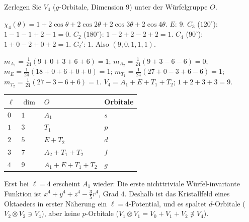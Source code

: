 \begin{aufgabe}
Zerlegen Sie $V_4$ ($g$-Orbitale, Dimension $9$) unter der Würfelgruppe $O$.

\loesung
{}
$\chi_4(\theta) = 1 + 2\cos\theta + 2\cos2\theta + 2\cos3\theta + 2\cos4\theta$. $E$: $9$. $C_3$ ($120^{\circ}$): $1 - 1 - 1 + 2 - 1 = 0$. $C_2$ ($180^{\circ}$): $1 - 2 + 2 - 2 + 2 = 1$. $C_4$ ($90^{\circ}$): $1 + 0 - 2 + 0 + 2 = 1$. $C_2'$: $1$. Also $(9, 0, 1, 1, 1)$.

$m_{A_1} = \frac1{24}(9 + 0 + 3 + 6 + 6) = 1$; $m_{A_2} = \frac1{24}(9 + 3 - 6 - 6) = 0$; $m_E = \frac1{24}(18 + 0 + 6 + 0 + 0) = 1$; $m_{T_1} = \frac1{24}(27 + 0 - 3 + 6 - 6) = 1$; $m_{T_2} = \frac1{24}(27 - 3 - 6 + 6) = 1$. $V_4 = A_1 + E + T_1 + T_2$; $1 + 2 + 3 + 3 = 9$. \checkmark

\begin{center}
{\small
\renewcommand{\arraystretch}{1.46}
\begin{tabular}{@{}P{0.8cm}P{0.8cm}P{4.4cm}P{2.2cm}@{}}
\toprule
$\ell$ & $\dim$ & $O$ & Orbitale\\
\midrule
$0$ & $1$ & $A_1$ & $s$\\
$1$ & $3$ & $T_1$ & $p$\\
$2$ & $5$ & $E + T_2$ & $d$\\
$3$ & $7$ & $A_2 + T_1 + T_2$ & $f$\\
$4$ & $9$ & $A_1 + E + T_1 + T_2$ & $g$\\
\bottomrule
\end{tabular}}
\end{center}
Erst bei $\ell = 4$ erscheint $A_1$ wieder: Die erste nichttriviale Würfel-invariante Funktion ist $x^{4} + y^{4} + z^{4} - \frac35r^{4}$, Grad $4$. Deshalb ist das Kristallfeld eines Oktaeders in erster Näherung ein $\ell = 4$-Potential, und es spaltet $d$-Orbitale ($V_2\otimes V_2\ni V_4$), aber keine $p$-Orbitale ($V_1\otimes V_1 = V_0 + V_1 + V_2\not\ni V_4$).

\begin{center}
\begin{minipage}{0.88\textwidth}
\end{minipage}
\end{center}
\end{aufgabe}

